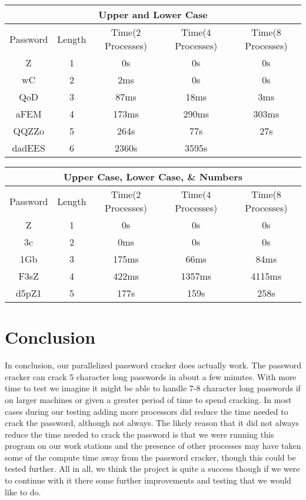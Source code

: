 \documentclass[11pt]{article}
\begin{document}
\begin{center}
 \begin{tabular}{||c c c c c||} 
 \hline
 
 \multicolumn{5}{|c|}{Upper and Lower Case} \\
 \hline
 \hline
 Password & Length & Time(2 Processes) & Time(4 Processes) & Time(8 Processes) \\ [0.5ex] 
 \hline\hline
 Z & 1 & 0s & 0s & 0s\\ 
 \hline
 wC & 2 & 2ms & 0s & 0s\\
 \hline
 QoD & 3 & 87ms & 18ms & 3ms\\
 \hline
 aFEM & 4 & 173ms & 290ms & 303ms\\
 \hline
 QQZZo & 5 & 264s & 77s & 27s\\ 
 \hline
 dadEES & 6 & 2360s & 3595s & \\
 [1ex] 
 \hline
\end{tabular}
\end{center}

\begin{center}
 \begin{tabular}{||c c c c c||} 
 \hline
 
 \multicolumn{5}{|c|}{Upper Case, Lower Case, \& Numbers} \\
 \hline
 \hline
 Password & Length & Time(2 Processes) & Time(4 Processes) & Time(8 Processes) \\ [0.5ex] 
 \hline\hline
 Z & 1 & 0s & 0s & 0s\\ 
 \hline
 3c & 2 & 0ms & 0s & 0s\\
 \hline
 1Gb & 3 & 175ms & 66ms & 84ms\\
 \hline
 F3sZ & 4 & 422ms & 1357ms & 4115ms\\
 \hline
 d5pZ1 & 5 & 177s & 159s & 258s\\ 
 [1ex] 
 \hline
\end{tabular}
\end{center}

\section{Conclusion}

In conclusion, our parallelized password cracker does actually work. The password cracker can crack 5 character long passwords in about a few minutes. With more time to test we imagine it might be able to handle 7-8 character long passwords if on larger machines or given a greater period of time to spend cracking. In most cases during our testing adding more processors did reduce the time needed to crack the password, although not always. The likely reason that it did not always reduce the time needed to crack the password is that we were running this program on our work stations and the presence of other processes may have taken some of the compute time away from the password cracker, though this could be tested further. All in all, we think the project is quite a success though if we were to continue with it there some further improvements and testing that we would like to do.
\end{document}
